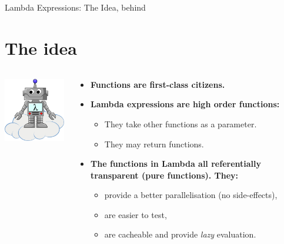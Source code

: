 \documentclass{beamer}
\begin{document}
	\begin{frame}{Lambda Expressions: The Idea, behind}
		\section{The idea}
		\begin{columns}
    			\begin{column}{0.3\textwidth}
					\centering
					\includegraphics[width=4cm]{cloudlambdabot}	
    			\end{column}
    			\begin{column}{0.7\textwidth}
					
					\begin{itemize}
						\item \textbf{Functions are first-class citizens.}
						\item \textbf{Lambda expressions are high order functions:}
						\begin{itemize}
						\item They take other functions as a parameter.	
						\item They may return functions.					
						\end{itemize}
						\item \textbf{The functions in Lambda all referentially transparent (pure functions). They:} 
						\begin{itemize}
						\item provide a better parallelisation (no side-effects),	
						\item are easier to test,		
						\item are cacheable and provide \textit{lazy} evaluation.				
						\end{itemize}
					\end{itemize}
    			\end{column}
		\end{columns}
	\end{frame}	
	
\end{document}
